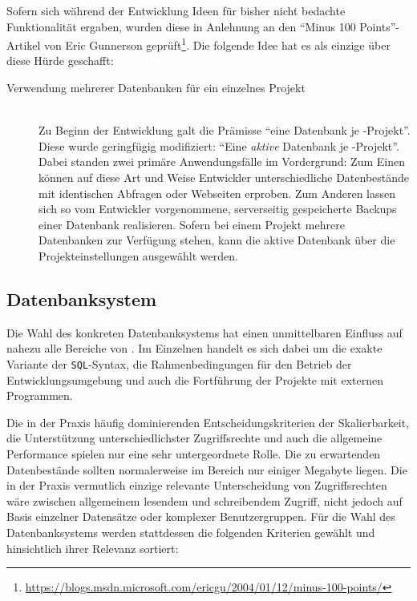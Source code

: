 Sofern sich während der Entwicklung Ideen für bisher nicht bedachte Funktionalität ergaben, wurden diese in Anlehnung an den "`Minus 100 Points"'-Artikel von Eric Gunnerson geprüft\footnote{\url{https://blogs.msdn.microsoft.com/ericgu/2004/01/12/minus-100-points/}}. Die folgende Idee hat es als einzige über diese Hürde geschafft:

\begin{description}
\item[Verwendung mehrerer Datenbanken für ein einzelnes Projekt] \hfill\\
  Zu Beginn der Entwicklung galt die Prämisse "`eine Datenbank je \idename{}-Projekt"'. Diese wurde geringfügig modifiziert: "`Eine \textit{aktive} Datenbank je \idename{}-Projekt"'. Dabei standen zwei primäre Anwendungsfälle im Vordergrund: Zum Einen können auf diese Art und Weise Entwickler unterschiedliche Datenbestände mit identischen Abfragen oder Webseiten erproben. Zum Anderen lassen sich so vom Entwickler vorgenommene, serverseitig gespeicherte Backups einer Datenbank realisieren. Sofern bei einem Projekt mehrere Datenbanken zur Verfügung stehen, kann die aktive Datenbank über die Projekteinstellungen ausgewählt werden.
\end{description}

\subsection{Datenbanksystem}
\label{sec:implementation-database-system}

Die Wahl des konkreten Datenbanksystems hat einen unmittelbaren Einfluss auf nahezu alle Bereiche von \idename. Im Einzelnen handelt es sich dabei um die exakte Variante der \texttt{SQL}-Syntax, die Rahmenbedingungen für den Betrieb der Entwicklungsumgebung und auch die Fortführung der Projekte mit externen Programmen.

Die in der Praxis häufig dominierenden Entscheidungskriterien der Skalierbarkeit, die Unterstützung unterschiedlichster Zugriffsrechte und auch die allgemeine Performance spielen nur eine sehr untergeordnete Rolle. Die zu erwartenden Datenbestände sollten normalerweise im Bereich nur einiger Megabyte liegen. Die in der Praxis vermutlich einzige relevante Unterscheidung von Zugriffsrechten wäre zwischen allgemeinem lesendem und schreibendem Zugriff, nicht jedoch auf Basis einzelner Datensätze oder komplexer Benutzergruppen. Für die Wahl des Datenbanksystems werden stattdessen die folgenden Kriterien gewählt und hinsichtlich ihrer Relevanz sortiert:

